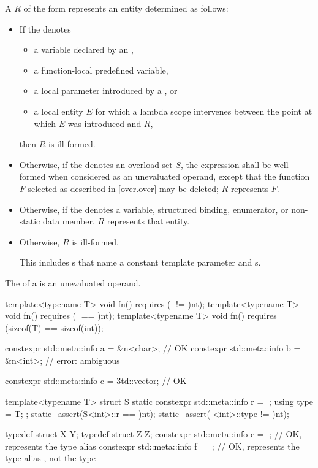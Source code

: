 \pnum
A  $R$ of the form
represents an entity determined as follows:
\begin{itemize}
\item
If the  denotes
\begin{itemize}
\item
a variable declared by
an ,
\item
a function-local predefined variable,
\item
a local parameter introduced by
a , or
\item
a local entity $E$ for which a lambda scope intervenes
between the point at which $E$ was introduced and $R$,
\end{itemize}
then $R$ is ill-formed.
\item
Otherwise, if the  denotes an overload set $S$,
the expression  shall be well-formed
when considered as an unevaluated operand,
except that the function $F$ selected as described in \ref{over.over}
may be deleted;
$R$ represents $F$.
\item
Otherwise, if the  denotes
a variable, structured binding, enumerator, or non-static data member,
$R$ represents that entity.
\item
Otherwise, $R$ is ill-formed.
\begin{note}
This includes s
that name a constant template parameter and
s.
\end{note}
\end{itemize}
The  of
a  is an unevaluated operand.
\begin{example}
\begin{codeblock}
template<typename T> void fn() requires (^^T != ^^int);
template<typename T> void fn() requires (^^T == ^^int);
template<typename T> void fn() requires (sizeof(T) == sizeof(int));

constexpr std::meta::info a = ^^fn<char>;       // OK
constexpr std::meta::info b = ^^fn<int>;        // error: ambiguous

constexpr std::meta::info c = ^^std::vector;    // OK

template<typename T>
struct S {
  static constexpr std::meta::info r = ^^T;
  using type = T;
};
static_assert(S<int>::r == ^^int);
static_assert(^^S<int>::type != ^^int);

typedef struct X {} Y;
typedef struct Z {} Z;
constexpr std::meta::info e = ^^Y;              // OK, represents the type alias 
constexpr std::meta::info f = ^^Z;              // OK, represents the type alias , not the type
\end{codeblock}
\end{example}

